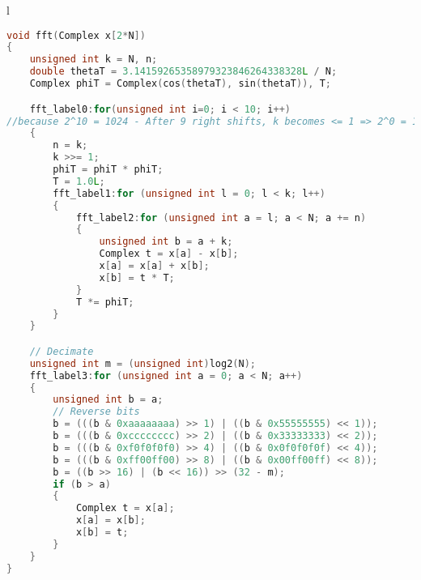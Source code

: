 \begin{table}[!h]
\centering
\caption{Radix-2 DIF FFT}
\label{fhewcode2:CTfft}
\begin{tabular}{l}
\toprule
\begin{lstlisting}[columns=fullflexible, language=C++,escapechar=\$]
void fft(Complex x[2*N])
{
	unsigned int k = N, n;
	double thetaT = 3.14159265358979323846264338328L / N;
	Complex phiT = Complex(cos(thetaT), sin(thetaT)), T;

	fft_label0:for(unsigned int i=0; i < 10; i++) 
//because 2^10 = 1024 - After 9 right shifts, k becomes <= 1 => 2^0 = 1
	{
		n = k;
		k >>= 1;
		phiT = phiT * phiT;
		T = 1.0L;
		fft_label1:for (unsigned int l = 0; l < k; l++)
		{
			fft_label2:for (unsigned int a = l; a < N; a += n)
			{
				unsigned int b = a + k;
				Complex t = x[a] - x[b];
				x[a] = x[a] + x[b];
				x[b] = t * T;
			}
			T *= phiT;
		}
	}

	// Decimate
	unsigned int m = (unsigned int)log2(N);
	fft_label3:for (unsigned int a = 0; a < N; a++)
	{
		unsigned int b = a;
		// Reverse bits
		b = (((b & 0xaaaaaaaa) >> 1) | ((b & 0x55555555) << 1));
		b = (((b & 0xcccccccc) >> 2) | ((b & 0x33333333) << 2));
		b = (((b & 0xf0f0f0f0) >> 4) | ((b & 0x0f0f0f0f) << 4));
		b = (((b & 0xff00ff00) >> 8) | ((b & 0x00ff00ff) << 8));
		b = ((b >> 16) | (b << 16)) >> (32 - m);
		if (b > a)
		{
			Complex t = x[a];
			x[a] = x[b];
			x[b] = t;
		}
	}
}
\end{lstlisting}
\\
\bottomrule
\end{tabular}
\end{table}